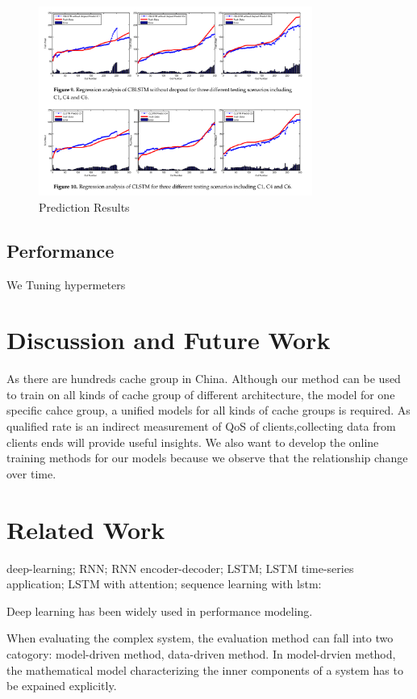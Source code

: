 \documentclass[5p]{elsarticle}
\begin{document}
\begin{figure}[h]
    \centering
    \includegraphics[width=0.8\textwidth]{experiment_results.png}
    \caption{Prediction Results}
    \label{fig:Prediction Results}
\end{figure}

\subsection{Performance}
We Tuning hypermeters

\section{Discussion and Future Work}
As there are hundreds cache group in China. Although our method can be used to train on all kinds of cache group of different architecture, the model for one specific cahce group, a unified models for all kinds of cache groups is required. As qualified rate is an indirect measurement of QoS of clients,collecting data from clients ends will provide useful insights. We also want to develop the online training methods for our models because we observe that the relationship change over time.


\section{Related Work}
deep-learning; RNN; RNN encoder-decoder; LSTM; LSTM time-series application; LSTM with attention; sequence learning with lstm:

Deep learning has been widely used in performance modeling. 

When evaluating the complex system, the evaluation method can fall into two catogory: model-driven method, data-driven method. In model-drvien method, the mathematical model characterizing the inner components of a system has to be expained explicitly. 
\end{document}
